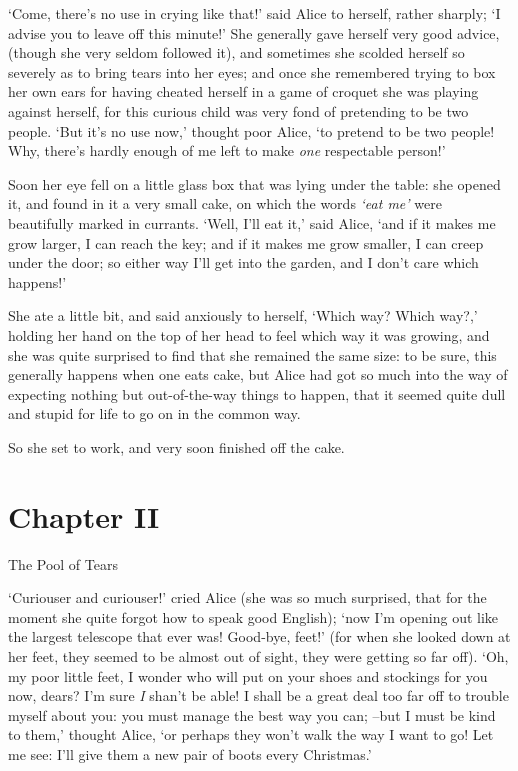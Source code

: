   `Come, there's no use in crying like that!' said Alice to
herself, rather sharply; `I advise you to leave off this minute!'
She generally gave herself very good advice, (though she very
seldom followed it), and sometimes she scolded herself so
severely as to bring tears into her eyes; and once she remembered
trying to box her own ears for having cheated herself in a game
of croquet she was playing against herself, for this curious
child was very fond of pretending to be two people.  `But it's no
use now,' thought poor Alice, `to pretend to be two people!  Why,
there's hardly enough of me left to make {\it one} respectable
person!'

  Soon her eye fell on a little glass box that was lying under
the table:  she opened it, and found in it a very small cake, on
which the words {\it `eat me'} were beautifully marked in currants.
`Well, I'll eat it,' said Alice, `and if it makes me grow larger,
I can reach the key; and if it makes me grow smaller, I can creep
under the door; so either way I'll get into the garden, and I
don't care which happens!'

  She ate a little bit, and said anxiously to herself, `Which
way?  Which way?,' holding her hand on the top of her head to
feel which way it was growing, and she was quite surprised to
find that she remained the same size:  to be sure, this generally
happens when one eats cake, but Alice had got so much into the
way of expecting nothing but out-of-the-way things to happen,
that it seemed quite dull and stupid for life to go on in the
common way.

  So she set to work, and very soon finished off the cake.


\chapter{Chapter II}{The Pool of Tears}


  `Curiouser and curiouser!' cried Alice (she was so much
surprised, that for the moment she quite forgot how to speak good
English); `now I'm opening out like the largest telescope that
ever was!  Good-bye, feet!' (for when she looked down at her
feet, they seemed to be almost out of sight, they were getting so
far off).  `Oh, my poor little feet, I wonder who will put on
your shoes and stockings for you now, dears?  I'm sure {\it I} shan't
be able!  I shall be a great deal too far off to trouble myself
about you:  you must manage the best way you can; --but I must be
kind to them,' thought Alice, `or perhaps they won't walk the
way I want to go!  Let me see:  I'll give them a new pair of
boots every Christmas.'

